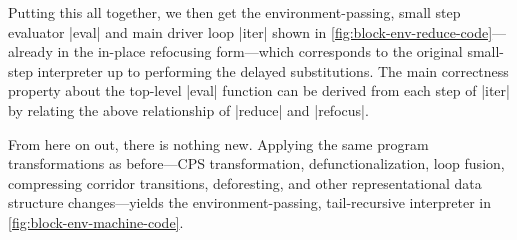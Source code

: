 Putting this all together, we then get the environment-passing, small step
evaluator \hs|eval| and main driver loop \hs|iter| shown in
\cref{fig:block-env-reduce-code}---already in the in-place refocusing
form---which corresponds to the original small-step interpreter up to performing
the delayed substitutions.  The main correctness property about the top-level
\hs|eval| function can be derived from each step of \hs|iter| by relating the
above relationship of \hs|reduce| and \hs|refocus|.

From here on out, there is nothing new.  Applying the same program
transformations as before---CPS transformation, defunctionalization, loop
fusion, compressing corridor transitions, deforesting, and other
representational data structure changes---yields the environment-passing,
tail-recursive interpreter in \cref{fig:block-env-machine-code}.

